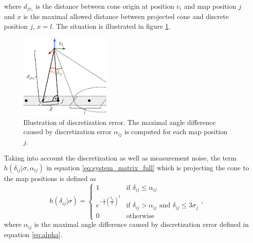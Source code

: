 where $d_{jv_{i}}$ is the distance between cone origin at position $v_{i}$ and map position $j$ and $x$ is the maximal allowed distance between projected cone and discrete position $j$, $x = l$.
The situation is illustrated in figure \ref{fig:discret}.

\begin{figure}
  \centering
\includegraphics[width=0.4\textwidth]{./fig/photos/discret.eps}
  \caption{Illustration of discretization error. The maximal angle difference caused by discretization error $\alpha_{ij}$ is computed for each map position $j$.}
  \label{fig:discret}
\end{figure}

Taking into account the discretization as well as measurement noise, the term $h(\delta_{ij}|\sigma, \alpha_{ij})$ in equation \ref{eq:system_matrix_full} which is projecting the cone to the map positions is defined as
\begin{equation}
h(\delta_{ij}|\sigma) =
\begin{cases}
1 & \text{if $\delta_{ij}\leq \alpha_{ij}$}\\ 
e^{- \frac{1}{2}(\frac{\delta_{ij}}{\sigma})^{2}} & \text{if $\delta_{ij} > \alpha_{ij}$ and  $\delta_{ij} \leq 3\sigma_{j}$} \\
0 & \text{otherwise}
\end{cases}, 
\end{equation}
where $\alpha_{ij}$ is the maximal angle difference caused by discretization error defined in equation \ref{eq:alpha}.




